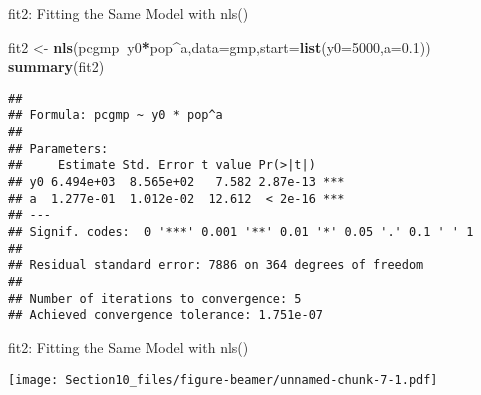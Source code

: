 \documentclass[8pt,ignorenonframetext,]{beamer}
\newenvironment{Shaded}{\begin{snugshade}}{\end{snugshade}}
\newcommand{\KeywordTok}[1]{\textcolor[rgb]{0.13,0.29,0.53}{\textbf{#1}}}
\newcommand{\DataTypeTok}[1]{\textcolor[rgb]{0.13,0.29,0.53}{#1}}
\newcommand{\DecValTok}[1]{\textcolor[rgb]{0.00,0.00,0.81}{#1}}
\newcommand{\FloatTok}[1]{\textcolor[rgb]{0.00,0.00,0.81}{#1}}
\newcommand{\StringTok}[1]{\textcolor[rgb]{0.31,0.60,0.02}{#1}}
\newcommand{\OtherTok}[1]{\textcolor[rgb]{0.56,0.35,0.01}{#1}}
\newcommand{\OperatorTok}[1]{\textcolor[rgb]{0.81,0.36,0.00}{\textbf{#1}}}
\newcommand{\NormalTok}[1]{#1}
\begin{document}
\begin{frame}[fragile]{fit2: Fitting the Same Model with nls()}

\begin{Shaded}
\begin{Highlighting}[]
\NormalTok{fit2 <-}\StringTok{ }\KeywordTok{nls}\NormalTok{(pcgmp}\OperatorTok{~}\NormalTok{y0}\OperatorTok{*}\NormalTok{pop}\OperatorTok{^}\NormalTok{a,}\DataTypeTok{data=}\NormalTok{gmp,}\DataTypeTok{start=}\KeywordTok{list}\NormalTok{(}\DataTypeTok{y0=}\DecValTok{5000}\NormalTok{,}\DataTypeTok{a=}\FloatTok{0.1}\NormalTok{))}
\KeywordTok{summary}\NormalTok{(fit2)}
\end{Highlighting}
\end{Shaded}

\begin{verbatim}
## 
## Formula: pcgmp ~ y0 * pop^a
## 
## Parameters:
##     Estimate Std. Error t value Pr(>|t|)    
## y0 6.494e+03  8.565e+02   7.582 2.87e-13 ***
## a  1.277e-01  1.012e-02  12.612  < 2e-16 ***
## ---
## Signif. codes:  0 '***' 0.001 '**' 0.01 '*' 0.05 '.' 0.1 ' ' 1
## 
## Residual standard error: 7886 on 364 degrees of freedom
## 
## Number of iterations to convergence: 5 
## Achieved convergence tolerance: 1.751e-07
\end{verbatim}

\end{frame}

\begin{frame}[fragile]{fit2: Fitting the Same Model with nls()}

\begin{Shaded}
\end{Shaded}

\texttt{[image: Section10\_files/figure-beamer/unnamed-chunk-7-1.pdf]}

\end{frame}
\end{document}
